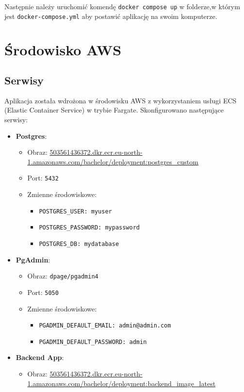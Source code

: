 Następnie należy uruchomić komendę \texttt{docker compose up} w folderze,w którym jest \texttt{docker-compose.yml} aby postawić aplikację na swoim komputerze.

\section{Środowisko AWS}
\subsection{Serwisy}
Aplikacja została wdrożona w środowisku AWS z wykorzystaniem usługi ECS (Elastic Container Service) w trybie Fargate. Skonfigurowano następujące serwisy:
\begin{itemize}
    \item \textbf{Postgres}:
    \begin{itemize}
        \item Obraz: \url{503561436372.dkr.ecr.eu-north-1.amazonaws.com/bachelor/deployment:postgres_custom}
        \item Port: \texttt{5432}
        \item Zmienne środowiskowe:
        \begin{itemize}
            \item \texttt{POSTGRES\_USER: myuser}
            \item \texttt{POSTGRES\_PASSWORD: mypassword}
            \item \texttt{POSTGRES\_DB: mydatabase}
        \end{itemize}
    \end{itemize}
    \item \textbf{PgAdmin}:
    \begin{itemize}
        \item Obraz: \texttt{dpage/pgadmin4}
        \item Port: \texttt{5050}
        \item Zmienne środowiskowe:
        \begin{itemize}
            \item \texttt{PGADMIN\_DEFAULT\_EMAIL: admin@admin.com}
            \item \texttt{PGADMIN\_DEFAULT\_PASSWORD: admin}
        \end{itemize}
    \end{itemize}
    \item \textbf{Backend App}:
    \begin{itemize}
        \item Obraz: \url{503561436372.dkr.ecr.eu-north-1.amazonaws.com/bachelor/deployment:backend_image_latest}

\end{itemize}
\end{itemize}
